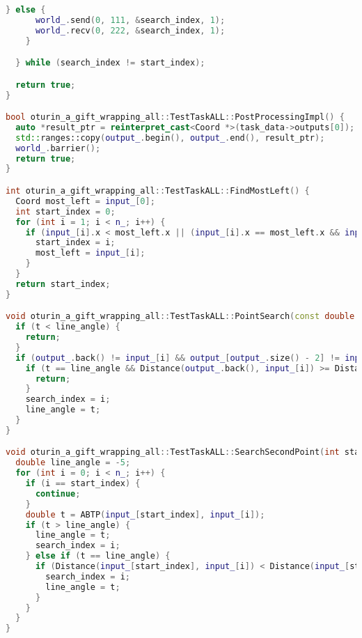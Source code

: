 \documentclass[12pt,a4paper]{extarticle}
\begin{document}
\begin{lstlisting}[language=C++]
    } else {
      world_.send(0, 111, &search_index, 1);
      world_.recv(0, 222, &search_index, 1);
    }

  } while (search_index != start_index);

  return true;
}

bool oturin_a_gift_wrapping_all::TestTaskALL::PostProcessingImpl() {
  auto *result_ptr = reinterpret_cast<Coord *>(task_data->outputs[0]);
  std::ranges::copy(output_.begin(), output_.end(), result_ptr);
  world_.barrier();
  return true;
}

int oturin_a_gift_wrapping_all::TestTaskALL::FindMostLeft() {
  Coord most_left = input_[0];
  int start_index = 0;
  for (int i = 1; i < n_; i++) {
    if (input_[i].x < most_left.x || (input_[i].x == most_left.x && input_[i].y > most_left.y)) {
      start_index = i;
      most_left = input_[i];
    }
  }
  return start_index;
}

void oturin_a_gift_wrapping_all::TestTaskALL::PointSearch(const double t, double &line_angle, int &search_index, const int i) {
  if (t < line_angle) {
    return;
  }
  if (output_.back() != input_[i] && output_[output_.size() - 2] != input_[i]) {
    if (t == line_angle && Distance(output_.back(), input_[i]) >= Distance(output_.back(), input_[search_index])) {
      return;
    }
    search_index = i;
    line_angle = t;
  }
}

void oturin_a_gift_wrapping_all::TestTaskALL::SearchSecondPoint(int start_index, int &search_index) {
  double line_angle = -5;
  for (int i = 0; i < n_; i++) {
    if (i == start_index) {
      continue;
    }
    double t = ABTP(input_[start_index], input_[i]);
    if (t > line_angle) {
      line_angle = t;
      search_index = i;
    } else if (t == line_angle) {
      if (Distance(input_[start_index], input_[i]) < Distance(input_[start_index], input_[search_index])) {
        search_index = i;
        line_angle = t;
      }
    }
  }
}
\end{lstlisting}
\end{document}
